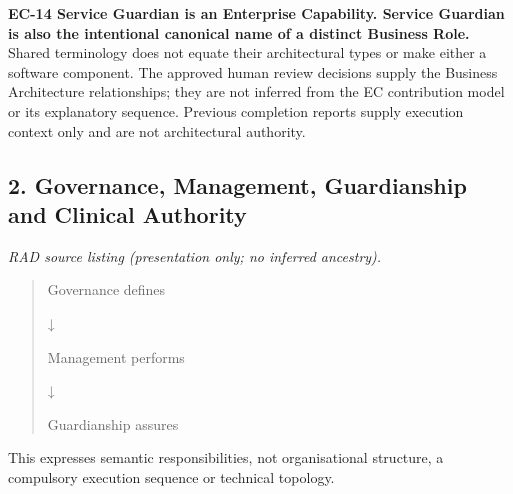 \label{rad:assurance:15}

\textbf{EC-14 Service Guardian is an Enterprise Capability. Service Guardian is also the intentional canonical name of a distinct Business Role.} Shared terminology does not equate their architectural types or make either a software component. The approved human review decisions supply the Business Architecture relationships; they are not inferred from the EC contribution model or its explanatory sequence. Previous completion reports supply execution context only and are not architectural authority.

\label{rad:assurance:17}
\subsection*{2. Governance, Management, Guardianship and Clinical Authority}
\label{rad:assurance:19}

\textit{RAD source listing (presentation only; no inferred ancestry).}
\begin{quote}
Governance defines

↓

Management performs

↓

Guardianship assures
\end{quote}
\label{rad:assurance:27}

This expresses semantic responsibilities, not organisational structure, a compulsory execution sequence or technical topology.

